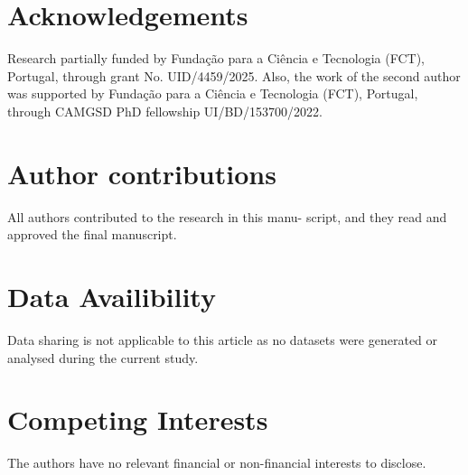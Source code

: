\documentclass{article}
\numberwithin{equation}{section}
\theoremstyle{plain}
\begin{document}
\section*{Acknowledgements}
Research partially funded by Fundação para a Ciência e Tecnologia (FCT), Portugal, through grant No. UID/4459/2025.
Also, the work of the second author was supported by Fundação para a Ciência e Tecnologia (FCT), Portugal, through CAMGSD PhD fellowship UI/BD/153700/2022.


\section*{Author contributions}
All authors contributed to the research in this manu-
script, and they read and approved the final manuscript.


\section*{Data Availibility}
Data sharing is not applicable to this article as no datasets
were generated or analysed during the current study.


\section*{Competing Interests}
The authors have no relevant financial or non-financial interests to disclose.





\end{document}
